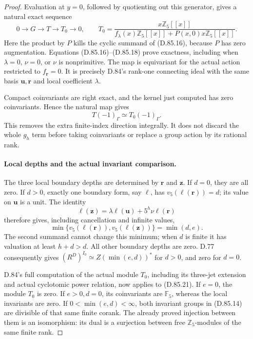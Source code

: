 \begin{proof}
Evaluation at \(y=0\), followed by quotienting out this
generator, gives a natural exact sequence
\[
 0\longrightarrow G\longrightarrow T\longrightarrow T_0
                       \longrightarrow0,
 \qquad
 T_0=\frac{x\mathbb Z_5[[x]]}
 {f_\lambda(x)\mathbb Z_5[[x]]+
                        P(x,0)x\mathbb Z_5[[x]]}.
                                                               \tag{D.85.20}
\]
Here the product by \(P\) kills the cyclic summand of
(D.85.16), because \(P\) has zero augmentation. Equations
(D.85.16)--(D.85.18) prove exactness, including when
\(\lambda=0\), \(\nu=0\), or \(\nu\) is nonprimitive.
The map is equivariant for the actual action restricted to
\(f_{\mathbf r}=0\). It is precisely D.84's rank-one
connecting ideal with the same basis \(\mathbf u,\mathbf r\)
and local coefficient \(\lambda\).

Compact coinvariants are right exact, and the kernel just
computed has zero coinvariants. Hence the natural map gives
\[
                    T(-1)_\Gamma\simeq T_0(-1)_\Gamma.
                                                               \tag{D.85.21}
\]
This removes the extra finite-index direction integrally.
It does not discard the whole \(g_h\) term before taking
coinvariants or replace a group action by its rational rank.

\paragraph{Local depths and the actual invariant comparison.}
The three local boundary depths are determined by
\(\mathbf r\) and \(\mathbf z\). If \(d=0\), they are
all zero. If \(d>0\), exactly one boundary form, say
\(\ell\), has \(v_5(\ell(\mathbf r))=d\); its value on
\(\mathbf u\) is a unit. The identity
\[
 \ell(\mathbf z)=\lambda\ell(\mathbf u)
                       +5^h\nu\ell(\mathbf r)
\]
therefore gives, including cancellation and infinite values,
\[
 \min\{v_5(\ell(\mathbf r)),v_5(\ell(\mathbf z))\}
                         =\min(d,e).
                                                               \tag{D.85.22}
\]
The second summand cannot change this minimum; when \(d\)
is finite it has valuation at least \(h+d>d\).
All other boundary depths are zero. D.77 consequently gives
\((R^D)^{I_0}\simeq Z(\min(e,d))^*\) for \(d>0\),
and zero for \(d=0\).

D.84's full computation of the actual module \(T_0\),
including its three-jet extension and actual cyclotomic
power relation, now applies to (D.85.21). If \(e=0\),
the module \(T_0\) is zero. If \(e>0,d=0\), its
coinvariants are \(\mathbb F_5\), whereas the local
invariants are zero. If \(0<\min(e,d)<\infty\), both
invariant groups in (D.85.14) are divisible of that same
finite corank. The already proved injection between them
is an isomorphism: its dual is a surjection between free
\(\mathbb Z_5\)-modules of the same finite rank.


\end{proof}

